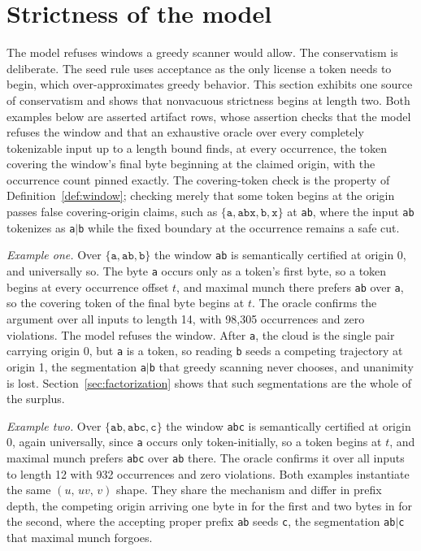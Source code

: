 \documentclass[11pt,a4paper]{article}
\theoremstyle{definition}
\theoremstyle{plain}
\newcommand{\code}[1]{\texttt{#1}}
\begin{document}
\section{Strictness of the model}
\label{sec:strictness}

The model refuses windows a greedy scanner would allow. The conservatism is deliberate. The seed rule uses acceptance as
the only license a token needs to begin, which over-approximates greedy behavior. This section exhibits one source of
conservatism and shows that nonvacuous strictness begins at length two. Both examples below are asserted artifact rows,
whose assertion checks that the model refuses the window and that an exhaustive oracle over every completely tokenizable
input up to a length bound finds, at every occurrence, the token covering the window's final byte beginning at the
claimed origin, with the occurrence count pinned exactly. The covering-token check is the property of
Definition~\ref{def:window}; checking merely that some token begins at the origin passes false covering-origin claims,
such as $\{\code{a}, \code{abx}, \code{b}, \code{x}\}$ at \code{ab}, where the input \code{ab} tokenizes as
\code{a}$\mid$\code{b} while the fixed boundary at the occurrence remains a safe cut.

\emph{Example one.} Over $\{\code{a}, \code{ab}, \code{b}\}$ the window \code{ab} is semantically certified at origin 0,
and universally so. The byte \code{a} occurs only as a token's first byte, so a token begins at every occurrence offset
$t$, and maximal munch there prefers \code{ab} over \code{a}, so the covering token of the final byte begins at $t$. The
oracle confirms the argument over all inputs to length 14, with 98{,}305 occurrences and zero violations. The model
refuses the window. After \code{a}, the cloud is the single pair carrying origin 0, but \code{a} is a token, so reading
\code{b} seeds a competing trajectory at origin 1, the segmentation \code{a}$\mid$\code{b} that greedy scanning never
chooses, and unanimity is lost. Section~\ref{sec:factorization} shows that such segmentations are the whole of the
surplus.

\emph{Example two.} Over $\{\code{ab}, \code{abc}, \code{c}\}$ the window \code{abc} is semantically certified at origin
0, again universally, since \code{a} occurs only token-initially, so a token begins at $t$, and maximal munch prefers
\code{abc} over \code{ab} there. The oracle confirms it over all inputs to length 12 with 932 occurrences and zero
violations. Both examples instantiate the same $(u,\, uv,\, v)$ shape. They share the mechanism and differ in prefix
depth, the competing origin arriving one byte in for the first and two bytes in for the second, where the accepting
proper prefix \code{ab} seeds \code{c}, the segmentation \code{ab}$\mid$\code{c} that maximal munch forgoes.
\end{document}
